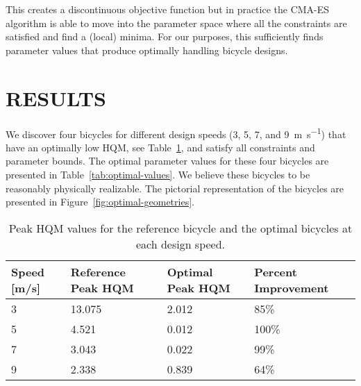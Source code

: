 \documentclass{bmd2019p}
\begin{document}
This creates a discontinuous objective function but in practice the CMA-ES
algorithm is able to move into the parameter space where all the constraints
are satisfied and find a (local) minima. For our purposes, this sufficiently
finds parameter values that produce optimally handling bicycle designs.

\section{RESULTS}
%
We discover four bicycles for different design speeds (3, 5, 7, and
9~\si{\meter\per\second}) that have an optimally low HQM, see
Table~\ref{tab:hqm}, and satisfy all constraints and parameter bounds. The
optimal parameter values for these four bicycles are presented in
Table~\ref{tab:optimal-values}. We believe these bicycles to be reasonably
physically realizable. The pictorial representation of the bicycles are
presented in Figure~\ref{fig:optimal-geometries}.
%
\begin{table}
  \caption{Peak HQM values for the reference bicycle and the optimal bicycles
    at each design speed.}
  \label{tab:hqm}
  \centering
  \begin{tabular}{llll}
    \toprule
    Speed [m/s] & Reference Peak HQM & Optimal Peak HQM & Percent Improvement \\
    \midrule
    3 & 13.075 & 2.012 & 85\% \\
    5 & 4.521  & 0.012 & 100\% \\
    7 & 3.043  & 0.022 & 99\% \\
    9 & 2.338  & 0.839 & 64\% \\
    \bottomrule
  \end{tabular}
\end{table}
%
\end{document}
